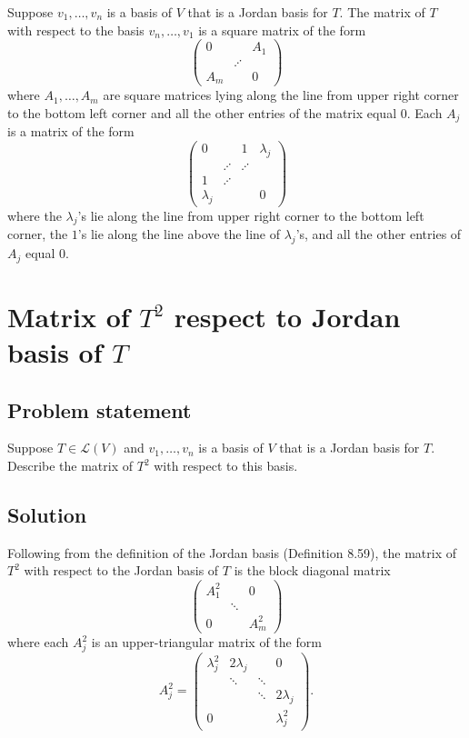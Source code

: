 \documentclass{article}
\begin{document}
Suppose $v_1,\dots,v_n$ is a basis of $V$ that is a Jordan basis for $T$. The matrix of $T$ with respect to the basis $v_n,\ldots,v_1$ is a square matrix of the form
\begin{equation*}
\begin{pmatrix}
0 & & A_1\\
& \iddots & \\
A_m & & 0
\end{pmatrix}
\end{equation*}
where $A_1,\ldots,A_m$ are square matrices lying along the line from upper right corner to the bottom left corner and all the other entries of the matrix equal $0$. 
Each $A_j$ is a matrix of the form
\begin{equation*}
\begin{pmatrix}
0 & & 1 &\lambda_j\\
& \iddots & \iddots & \\
1 & \iddots & & \\
\lambda_j & & & 0
\end{pmatrix}
\end{equation*}
where the $\lambda_j$'s lie along the line from upper right corner to the bottom left corner, the $1$'s lie along the line above the line of $\lambda_j$'s, and all the other entries of $A_j$ equal $0$.

\clearpage

\section{Matrix of $T^2$ respect to Jordan basis of $T$}
\subsection*{Problem statement}
Suppose $T\in\mathcal{L}(V)$ and $v_1,\ldots,v_n$ is a basis of $V$ that is a Jordan basis for $T$. 
Describe the matrix of $T^2$ with respect to this basis.

\subsection*{Solution}
Following from the definition of the Jordan basis (Definition 8.59), the matrix of $T^2$ with respect to the Jordan basis of $T$ is the block diagonal matrix
\begin{equation*}
\begin{pmatrix}
A_1^2 & & 0\\
& \ddots & \\
0 & & A_m^2
\end{pmatrix}
\end{equation*}
where each $A_j^2$ is an upper-triangular matrix of the form
\begin{equation*}
A_j^2=\begin{pmatrix}
\lambda_j^2 & 2\lambda_j & & 0 \\
& \ddots & \ddots & \\
& & \ddots & 2\lambda_j \\
0 & & & \lambda_j^2
\end{pmatrix}.
\end{equation*}
\end{document}

